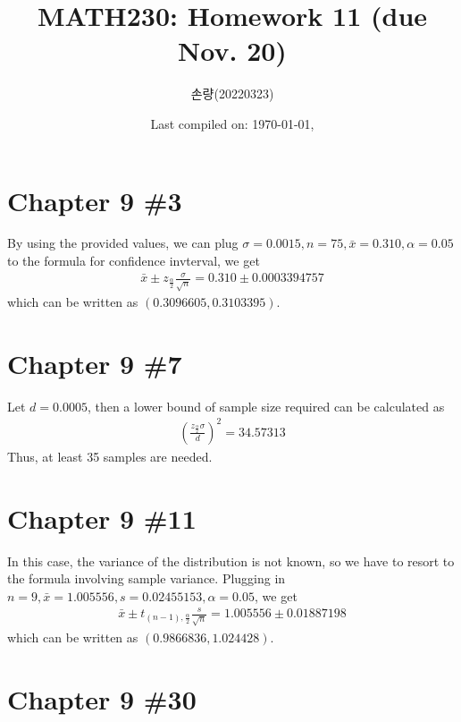 \documentclass{scrartcl}
\title{MATH230: Homework 11 (due Nov. 20)}
\author{손량(20220323)}
\date{Last compiled on: \today, \currenttime}
\begin{document}
\maketitle

\section{Chapter 9 \#3}
By using the provided values, we can plug \(\sigma = 0.0015, n = 75, \bar{x} =
0.310, \alpha = 0.05\) to the formula for confidence invterval, we get
\begin{align*}
  \bar{x} \pm z_\frac{\alpha}{2} \frac{\sigma}{\sqrt{n}}
  = 0.310 \pm 0.0003394757
\end{align*}
which can be written as \((0.3096605, 0.3103395)\).

\section{Chapter 9 \#7}
Let \(d = 0.0005\), then a lower bound of sample size required can be
calculated as
\begin{align*}
  \left( \frac{z_\frac{\alpha}{2} \sigma}{d} \right)^2
  = 34.57313
\end{align*}
Thus, at least 35 samples are needed.

\section{Chapter 9 \#11}
In this case, the variance of the distribution is not known, so we have to
resort to the formula involving sample variance. Plugging in \(n = 9, \bar{x} =
1.005556, s = 0.02455153, \alpha = 0.05\), we get
\begin{align*}
  \bar{x} \pm t_{(n - 1), \frac{\alpha}{2}} \frac{s}{\sqrt{n}}
  = 1.005556 \pm 0.01887198
\end{align*}
which can be written as \((0.9866836, 1.024428)\).

\section{Chapter 9 \#30}
\end{document}
